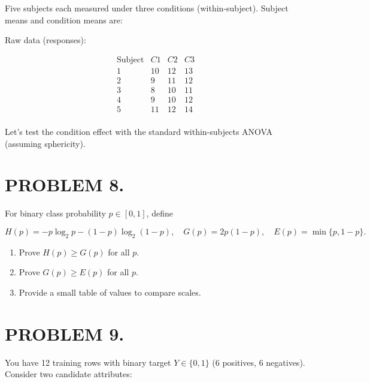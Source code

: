 \documentclass[12pt]{article}
\begin{document}
Five subjects each measured under three conditions (within-subject). Subject means and condition means are:

Raw data (responses):

\[\begin{array}{c|ccc}
\text{Subject} & C1 & C2 & C3 \\
\hline
1 & 10 & 12 & 13 \\
2 & 9 & 11 & 12 \\
3 & 8 & 10 & 11 \\
4 & 9 & 10 & 12 \\
5 & 11 & 12 & 14 \\
\end{array}\]

Let's test the condition effect with the standard within-subjects ANOVA (assuming sphericity).

\section*{PROBLEM 8.}

For binary class probability \(p \in [0,1]\), define

\[H(p) = -p \log_2 p - (1 - p) \log_2 (1 - p), \quad G(p) = 2p(1 - p), \quad E(p) = \min\{p, 1 - p\}.\]

\begin{enumerate}
\item[(a)] Prove \(H(p) \geq G(p)\) for all \(p\).
\item[(b)] Prove \(G(p) \geq E(p)\) for all \(p\).
\item[(c)] Provide a small table of values to compare scales.
\end{enumerate}

\newpage

\section*{PROBLEM 9.}

You have 12 training rows with binary target \(Y\in\{0,1\}\) (6 positives, 6 negatives). Consider two candidate attributes:
\end{document}
